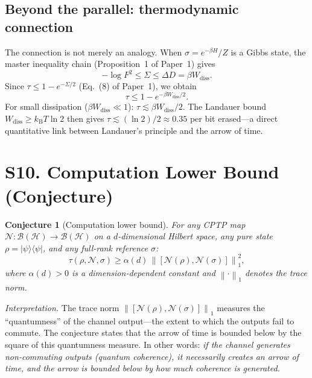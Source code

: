 \documentclass[prl,twocolumn,superscriptaddress,longbibliography]{revtex4-2}
\newtheorem{conjecture}[theorem]{Conjecture}
\newcommand{\kB}{k_{\mathrm{B}}}
\newcommand{\chan}{\mathcal{N}}
\newcommand{\hilb}{\mathcal{H}}
\newcommand{\ket}[1]{|#1\rangle}
\newcommand{\bra}[1]{\langle#1|}
\newcommand{\norm}[1]{\left\|#1\right\|}
\newcommand{\tauasym}{\tau}
\begin{document}
\subsection{Beyond the parallel: thermodynamic connection}

The connection is not merely an analogy.  When
$\sigma = e^{-\beta H}/Z$ is a Gibbs state, the master inequality
chain (Proposition~1 of Paper~1) gives
\begin{equation}
-\log F^2 \leq \Sigma \leq \Delta D = \beta W_{\mathrm{diss}}.
\end{equation}
Since $\tauasym \leq 1 - e^{-\Sigma/2}$ (Eq.~(8) of Paper~1),
we obtain
\begin{equation}
\tauasym \leq 1 - e^{-\beta W_{\mathrm{diss}}/2}.
\end{equation}
For small dissipation ($\beta W_{\mathrm{diss}} \ll 1$):
$\tauasym \lesssim \beta W_{\mathrm{diss}}/2$.  The Landauer bound
$W_{\mathrm{diss}} \geq \kB T \ln 2$ then gives
$\tauasym \lesssim (\ln 2)/2 \approx 0.35$ per bit erased---a
direct quantitative link between Landauer's principle and the
arrow of time.

\section{S10. Computation Lower Bound (Conjecture)}
\label{sec:conjecture}

\begin{conjecture}[Computation lower bound]
\label{conj:lower_bound}
For any CPTP map $\chan: \mathcal{B}(\hilb) \to \mathcal{B}(\hilb)$
on a $d$-dimensional Hilbert space, any pure state
$\rho = \ket{\psi}\!\bra{\psi}$, and any full-rank reference
$\sigma$:
\begin{equation}
\tauasym(\rho, \chan, \sigma) \geq \alpha(d)\,
\norm{[\chan(\rho), \chan(\sigma)]}_1^2,
\label{eq:lower_bound}
\end{equation}
where $\alpha(d) > 0$ is a dimension-dependent constant and
$\norm{\cdot}_1$ denotes the trace norm.
\end{conjecture}

\emph{Interpretation.}
The trace norm $\norm{[\chan(\rho), \chan(\sigma)]}_1$ measures the
``quantumness'' of the channel output---the extent to which the
outputs fail to commute.  The conjecture states that the arrow of
time is bounded below by the square of this quantumness measure.
In other words: \emph{if the channel generates non-commuting outputs
(quantum coherence), it necessarily creates an arrow of time, and
the arrow is bounded below by how much coherence is generated.}
\end{document}
